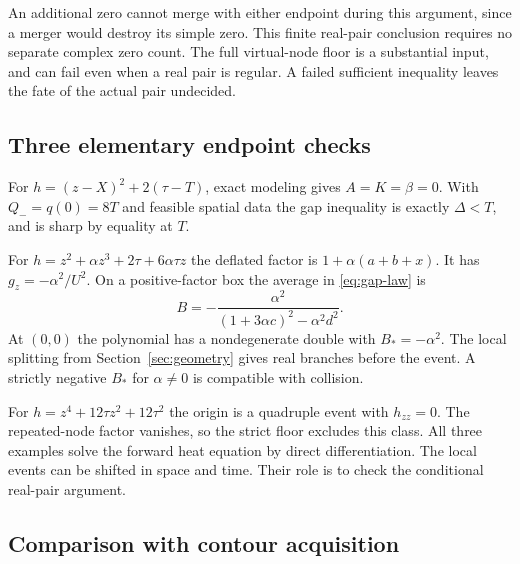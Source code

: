 An additional zero cannot merge with either endpoint during this
argument, since a merger would destroy its simple zero. This finite
real-pair conclusion requires no separate complex zero count.
The full virtual-node floor is a substantial input, and can fail
even when a real pair is regular. A failed sufficient inequality
leaves the fate of the actual pair undecided.

\subsection{Three elementary endpoint checks}

For \(h=(z-X)^2+2(\tau-T)\), exact modeling gives \(A=K=\beta=0\).
With \(Q_-=q(0)=8T\) and feasible spatial data the gap inequality
is exactly \(\Delta<T\), and is sharp by equality at \(T\).

For \(h=z^2+\alpha z^3+2\tau+6\alpha\tau z\) the deflated factor is
\(1+\alpha(a+b+x)\). It has \(g_z=-\alpha^2/U^2\). On a
positive-factor box the average in \eqref{eq:gap-law} is
\[
B=-\frac{\alpha^2}{(1+3\alpha c)^2-\alpha^2d^2}.
\]
At \((0,0)\) the polynomial has a nondegenerate double with
\(B_*=-\alpha^2\). The local splitting from Section~\ref{sec:geometry}
gives real branches before the event. A strictly negative \(B_*\)
for \(\alpha\ne0\) is compatible with collision.

For \(h=z^4+12\tau z^2+12\tau^2\) the origin is a quadruple
event with \(h_{zz}=0\). The repeated-node factor vanishes,
so the strict floor excludes this class. All three examples solve
the forward heat equation by direct differentiation. The local
events can be shifted in space and time. Their role
is to check the conditional real-pair argument.

\subsection{Comparison with contour acquisition}

